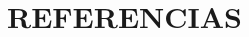 \documentclass[a4paper,openright,titlepage,12pt]{article}
\numberwithin{figure}{section} 													%
\numberwithin{table}{section} 														%
\numberwithin{equation}{section}
\begin{document}





\renewcommand{\thepage}{\Roman{page}}		%
\renewcommand{\contentsname}{ÍNDICE}			%
\begin{spacing}{1.5}
	\tableofcontents
\end{spacing}
\newpage
\renewcommand{\thepage}{\arabic{page}}		%
\setcounter{page}{2}											%

\sloppy 
















\renewcommand{\refname}{\thesection \ \ REFERENCIAS}	%
\section{REFERENCIAS}
\end{document}
